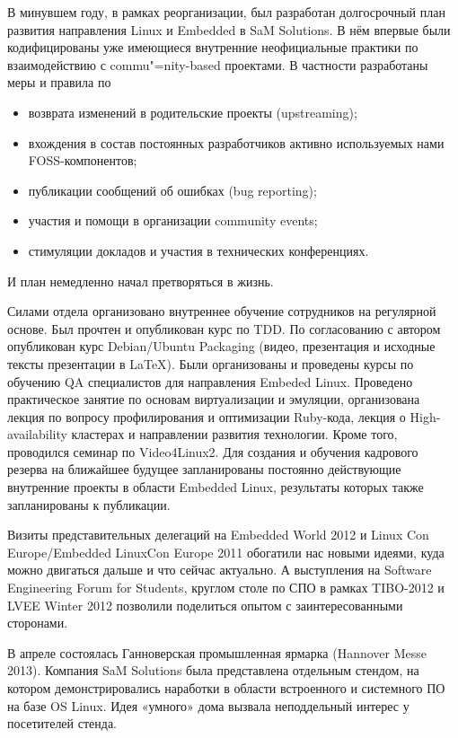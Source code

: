 \documentclass[10pt, a5paper]{article}
\begin{document}
В минувшем году, в рамках реорганизации, был разработан долгосрочный план развития направления Linux и Embedded в SaM Solutions. В нём впервые были кодифицированы уже имеющиеся внутренние неофициальные практики по взаимодействию с commu"=nity-based проектами. В частности разработаны меры и правила по
\begin{itemize}
  \item возврата изменений в родительские проекты (upstreaming);
  \item вхождения в состав постоянных разработчиков активно используемых нами FOSS-компонентов;
  \item публикации сообщений об ошибках (bug reporting);
  \item участия и помощи в организации community events;
  \item стимуляции докладов и участия в технических конференциях.
\end{itemize}
И план немедленно начал претворяться в жизнь.

Силами отдела организовано внутреннее обучение сотрудников на регулярной
основе. Был прочтен и опубликован курс по TDD. По согласованию с автором
опубликован курс Debian/Ubuntu Packaging (видео, презентация и исходные
тексты презентации в \LaTeX).  Были организованы и проведены курсы по
обучению QA специалистов для направления Embeded Linux. Проведено
практическое занятие по основам виртуализации и эмуляции, организована
лекция по вопросу профилирования и оптимизации Ruby-кода, лекция о
High-availability кластерах и направлении развития технологии. Кроме того,
проводился семинар по Video4Linux2. Для создания и обучения кадрового
резерва на ближайшее будущее запланированы постоянно действующие внутренние
проекты в области Embedded Linux, результаты которых также запланированы к
публикации.

Визиты представительных делегаций на Embedded World 2012 и Linux Con Europe/Embedded LinuxCon Europe 2011 обогатили нас новыми идеями, куда можно
двигаться дальше и что сейчас актуально. А выступления на Software
Engineering Forum for Students, круглом столе по СПО в рамках TIBO-2012
и LVEE Winter 2012 позволили поделиться опытом с
заинтересованными сторонами.

В апреле состоялась Ганноверская промышленная ярмарка \linebreak (Hannover Messe
2013). Компания SaM Solutions была представлена отдельным стендом, на
котором демонстрировались наработки в области встроенного и системного ПО
на базе OS Linux. Идея «умного» дома вызвала неподдельный интерес у
посетителей стенда.
\end{document}
